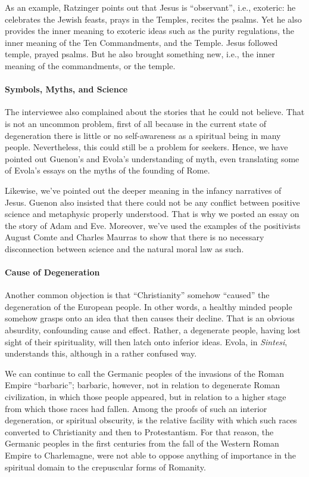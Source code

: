 As an example, Ratzinger points out that Jesus is ``observant'', i.e., exoteric: he celebrates the Jewish feasts, prays in the Temples, recites the psalms. Yet he also provides the inner meaning to exoteric ideas such as the purity regulations, the inner meaning of the Ten Commandments, and the Temple. Jesus followed temple, prayed psalms. But he also brought something new, i.e., the inner meaning of the commandments, or the temple.

\paragraph{Symbols, Myths, and Science}


The interviewee also complained about the stories that he could not believe. That is not an uncommon problem, first of all because in the current state of degeneration there is little or no self-awareness as a spiritual being in many people. Nevertheless, this could still be a problem for seekers. Hence, we have pointed out Guenon's and Evola's understanding of myth, even translating some of Evola's essays on the myths of the founding of Rome.

Likewise, we've pointed out the deeper meaning in the infancy narratives of Jesus. Guenon also insisted that there could not be any conflict between positive science and metaphysic properly understood. That is why we posted an essay on the story of Adam and Eve. Moreover, we've used the examples of the positivists August Comte and Charles Maurras to show that there is no necessary disconnection between science and the natural moral law as such.

\paragraph{Cause of Degeneration}


Another common objection is that ``Christianity'' somehow ``caused'' the degeneration of the European people. In other words, a healthy minded people somehow grasps onto an idea that then causes their decline. That is an obvious absurdity, confounding cause and effect. Rather, a degenerate people, having lost sight of their spirituality, will then latch onto inferior ideas. Evola, in \emph{Sintesi}, understands this, although in a rather confused way.

\begin{quotex}
We can continue to call the Germanic peoples of the invasions of the Roman Empire ``barbaric''; barbaric, however, not in relation to degenerate Roman civilization, in which those people appeared, but in relation to a higher stage from which those races had fallen. Among the proofs of such an interior degeneration, or spiritual obscurity, is the relative facility with which such races converted to Christianity and then to Protestantism. For that reason, the Germanic peoples in the first centuries from the fall of the Western Roman Empire to Charlemagne, were not able to oppose anything of importance in the spiritual domain to the crepuscular forms of Romanity.
\end{quotex}


